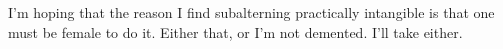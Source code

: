 

I'm hoping that the reason I find subalterning practically intangible
is that one must be female to do it.  Either that, or I'm not
demented.  I'll take either.

\bye
